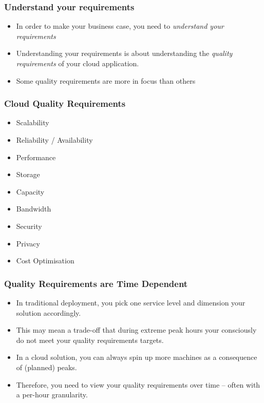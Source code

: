 \documentclass[10pt]{beamer}
\def\subitem{\item[\hspace{1.5cm} -]}
\begin{document}
\begin{frame}[t]
\frametitle{Understand your requirements}
\begin{itemize}
\item In order to make your business case, you need to \emph{understand your requirements}
\item Understanding your requirements is about understanding the \emph{quality requirements} of your cloud application.
\item Some quality requirements are more in focus than others 
\end{itemize}
\end{frame}

\begin{frame}[t]
\frametitle{Cloud Quality Requirements}
\begin{itemize}
\item Scalability
\item Reliability / Availability
\item Performance
\subitem Storage
\subitem Capacity
\subitem Bandwidth
\item Security
\item Privacy
\item Cost Optimisation
\end{itemize}
\end{frame}

\begin{frame}[t]
\frametitle{Quality Requirements are Time Dependent}
\begin{itemize}
\item In traditional deployment, you pick one service level and dimension your solution accordingly.
\item This may mean a trade-off that during extreme peak hours your consciously do not meet your quality requirements targets.
\item In a cloud solution, you can always spin up more machines as a consequence of (planned) peaks.
\item Therefore, you need to view your quality requirements over time -- often with a per-hour granularity.
\end{itemize}
\end{frame}
\end{document}
